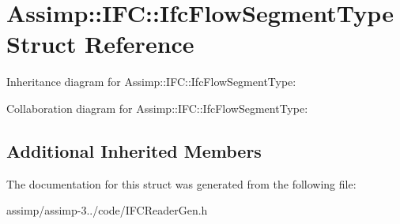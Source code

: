 \hypertarget{struct_assimp_1_1_i_f_c_1_1_ifc_flow_segment_type}{\section{Assimp\+:\+:I\+F\+C\+:\+:Ifc\+Flow\+Segment\+Type Struct Reference}
\label{struct_assimp_1_1_i_f_c_1_1_ifc_flow_segment_type}
}


Inheritance diagram for Assimp\+:\+:I\+F\+C\+:\+:Ifc\+Flow\+Segment\+Type\+:


Collaboration diagram for Assimp\+:\+:I\+F\+C\+:\+:Ifc\+Flow\+Segment\+Type\+:
\subsection*{Additional Inherited Members}


The documentation for this struct was generated from the following file\+:\begin{DoxyCompactItemize}
\item 
assimp/assimp-\/3../code/I\+F\+C\+Reader\+Gen.\+h\end{DoxyCompactItemize}
